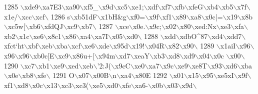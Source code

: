 \begin{DoxyCode}
1285 \textcolor{stringliteral}{\(\backslash\)xde9\(\backslash\)xa7E3\(\backslash\)xa90\(\backslash\)xf5\_\(\backslash\)x9d\(\backslash\)xc5\(\backslash\)xe1;\(\backslash\)xdf\(\backslash\)xf7\(\backslash\)xfb\(\backslash\)xfeG\(\backslash\)xb4\(\backslash\)xb5\(\backslash\)x7f\(\backslash\)x1e/\(\backslash\)xcc\(\backslash\)xcf\(\backslash\)}
1286 \textcolor{stringliteral}{s\(\backslash\)xb51dF\(\backslash\)x1bH&g\(\backslash\)xf0=\(\backslash\)x9f\(\backslash\)xf1\(\backslash\)x89\(\backslash\)xa8\(\backslash\)x0c|=\(\backslash\)x19\(\backslash\)x8b\(\backslash\)xc5w[\(\backslash\)xb6\(\backslash\)xfdQJ\(\backslash\)xc9\(\backslash\)xb7\(\backslash\)}
1287 \textcolor{stringliteral}{\(\backslash\)xce\(\backslash\)x0e.\(\backslash\)x9c;\(\backslash\)x02\(\backslash\)x80\(\backslash\)xed:Nx\(\backslash\)xe3\(\backslash\)xfa\(\backslash\)xb2\(\backslash\)x1c\(\backslash\)xe6\(\backslash\)x8c1\(\backslash\)x86\(\backslash\)xa4\(\backslash\)xa7I\(\backslash\)x05\(\backslash\)xd0\(\backslash\)}
1288 \textcolor{stringliteral}{\(\backslash\)xdd\(\backslash\)xdbO^87\(\backslash\)xd4\(\backslash\)xdd7\(\backslash\)xfct`ht\(\backslash\)xbf\(\backslash\)xeb\(\backslash\)xba\(\backslash\)xcf\(\backslash\)xe6\(\backslash\)xde\(\backslash\)x95d\(\backslash\)x19!\(\backslash\)x04R\(\backslash\)x82\(\backslash\)x90\(\backslash\)}
1289 \textcolor{stringliteral}{\(\backslash\)x1aiI\(\backslash\)x96\(\backslash\)x96\(\backslash\)x96\(\backslash\)xb0c[E\(\backslash\)xc9\(\backslash\)x86u+[\(\backslash\)x94m\(\backslash\)xd7\(\backslash\)xeaY\(\backslash\)xb3\(\backslash\)xd8\(\backslash\)xd9\(\backslash\)x04\(\backslash\)x0c \(\backslash\)x00\(\backslash\)}
1290 \textcolor{stringliteral}{\(\backslash\)xc7\(\backslash\)xb1\(\backslash\)xe9\(\backslash\)xed\(\backslash\)xeb\(\backslash\)'2:J(\(\backslash\)x9cC\(\backslash\)xe0\(\backslash\)xa7\(\backslash\)x9c\(\backslash\)xe9\(\backslash\)xe8T\(\backslash\)x93\(\backslash\)xd6\(\backslash\)xba\(\backslash\)x0e\(\backslash\)xb8\(\backslash\)xfe\(\backslash\)}
1291 \textcolor{stringliteral}{O\(\backslash\)x07\(\backslash\)x00B\(\backslash\)n\(\backslash\)xa4\(\backslash\)x80E%
1292 \textcolor{stringliteral}{\(\backslash\)x01\(\backslash\)x15\(\backslash\)x95\(\backslash\)xe5xI\(\backslash\)x9f\(\backslash\)xf1\(\backslash\)xd8\(\backslash\)x0c\(\backslash\)x13\(\backslash\)xc3\(\backslash\)xc3(\(\backslash\)xe5\(\backslash\)xd0\(\backslash\)xfe\(\backslash\)xa6-\(\backslash\)x0b\(\backslash\)x03\(\backslash\)x9d\(\backslash\)}
}
\end{DoxyCode}
